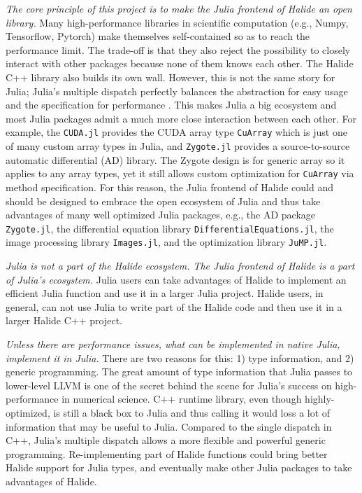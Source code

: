 \documentclass{article}
\begin{document}
\emph{The core principle of this project is to make the Julia frontend of Halide an open library.} Many high-performance libraries in scientific computation (e.g., Numpy, Tensorflow, Pytorch) make themselves self-contained so as to reach the performance limit. The trade-off is that they also reject the possibility to closely interact with other packages because none of them knows each other. The Halide C++ library also builds its own wall. However, this is not the same story for Julia; Julia's multiple dispatch perfectly balances the abstraction for easy usage and the specification for performance \cite{bezanson2017julia}. This makes Julia a big ecosystem and most Julia packages admit a much more close interaction between each other. For example, the \lstinline{CUDA.jl}\cite{besard2018juliagpu} provides the CUDA array type \lstinline{CuArray} which is just one of many custom array types in Julia, and \lstinline{Zygote.jl}\cite{Zygote2018} provides a source-to-source automatic differential (AD) library. The Zygote design is for generic array so it applies to any array types, yet it still allows custom optimization for \lstinline{CuArray} via method specification. For this reason, the Julia frontend of Halide could and should be designed to embrace the open ecosystem of Julia and thus take advantages of many well optimized Julia packages, e.g., the AD package \lstinline{Zygote.jl}\cite{Zygote2018}, the differential equation library \lstinline{DifferentialEquations.jl}\cite{DifferentialEquations2017}, the image processing library \lstinline{Images.jl}\cite{juliaimages}, and the optimization library \lstinline{JuMP.jl}\cite{JuMP2017}.

\emph{Julia is not a part of the Halide ecosystem. The Julia frontend of Halide is a part of Julia's ecosystem.} Julia users can take advantages of Halide to implement an efficient Julia function and use it in a larger Julia project. Halide users, in general, can not use Julia to write part of the Halide code and then use it in a larger Halide C++ project.

\emph{Unless there are performance issues, what can be implemented in native Julia, implement it in Julia.} There are two reasons for this: 1) type information, and 2) generic programming. The great amount of type information that Julia passes to lower-level LLVM is one of the secret behind the scene for Julia's success on high-performance in numerical science. C++ runtime library, even though highly-optimized, is still a black box to Julia and thus calling it would loss a lot of information that may be useful to Julia. Compared to the single dispatch in C++, Julia's multiple dispatch allows a more flexible and powerful generic programming. Re-implementing part of Halide functions could bring better Halide support for Julia types, and eventually make other Julia packages to take advantages of Halide.
\end{document}
